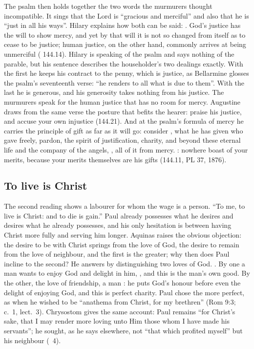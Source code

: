 The psalm then holds together the two words the murmurers thought
incompatible. It sings that the Lord is ``gracious and merciful'' and also
that he is ``just in all his ways''. Hilary explains how both can be said:
. God's justice has the will to show mercy,
and yet by that will it is not so changed from itself as to cease to be
justice; human justice, on the other hand, commonly arrives at being
unmerciful ( 144.14). Hilary is speaking of the
psalm and says nothing of the parable, but his sentence describes the
householder's two dealings exactly. With the first he keeps his contract to the
penny, which is justice, as Bellarmine glosses the psalm's seventeenth verse:
``he renders to all what is due to them''. With the last he is generous, and
his generosity takes nothing from his justice. The murmurers speak for the
human justice that has no room for mercy. Augustine draws from the same verse
the posture that befits the hearer: praise his justice, and accuse your own
injustice (144.21). And at the psalm's formula of mercy he carries the
principle of gift as far as it will go: consider , what he has given who gave freely, pardon, the spirit of
justification, charity, and beyond these eternal life and the company of the
angels, , all of it from mercy. : nowhere boast of your merits, because your
merits themselves are his gifts (144.11, PL 37, 1876).

\subsection{To live is Christ}

The second reading shows a labourer for whom the wage is a person. ``To me,
to live is Christ: and to die is gain.'' Paul already possesses what he
desires and desires what he already possesses, and his only hesitation is
between having Christ more fully and serving him longer. Aquinas raises the
obvious objection: the desire to be with Christ springs from the love of God,
the desire to remain from the love of neighbour, and the first is the greater;
why then does Paul incline to the second? He answers by distinguishing two
loves of God. . By one a man wants to enjoy God
and delight in him, , and this is the man's
own good. By the other, the love of friendship, a man :
he puts God's honour before even the delight of enjoying God, and this is
perfect charity. Paul chose the more perfect, as when he wished to be
``anathema from Christ, for my brethren'' (Rom 9:3; 
c.~1, lect.~3). Chrysostom gives the same account: Paul remains ``for Christ's
sake, that I may render more loving unto Him those whom I have made his
servants''; he sought, as he says elsewhere, not ``that which profited
myself'' but his neighbour (~4).

